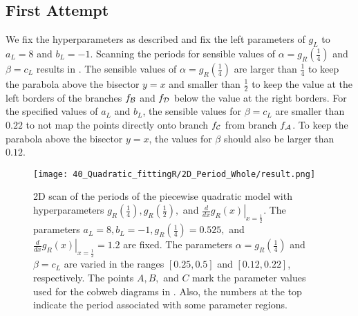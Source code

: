 \subsection{First Attempt}
\label{sec:setup.quad.hyper.1}

We fix the hyperparameters as described and fix the left parameters of $g_L$ to $a_L = 8$ and $b_L = -1$.
Scanning the periods for sensible values of $\alpha = g_R\left(\frac{1}{4}\right)$ and $\beta = c_L$ results in .
The sensible values of $\alpha = g_R\left(\frac{1}{4}\right)$ are larger than $\frac{1}{4}$ to keep the parabola above the bisector $y = x$ and smaller than $\frac{1}{2}$ to keep the value at the left borders of the branches $f_{\mathcal{B}}$ and $f_{\mathcal{D}}$ below the value at the right borders.
For the specified values of $a_L$ and $b_L$, the sensible values for $\beta = c_L$ are smaller than $0.22$ to not map the points directly onto branch $f_{\mathcal{C}}$ from branch $f_{\mathcal{A}}$.
To keep the parabola above the bisector $y = x$, the values for $\beta$ should also be larger than $0.12$.

\begin{figure}
	\centering
	\texttt{[image: 40\_Quadratic\_fittingR/2D\_Period\_Whole/result.png]}
	\caption[2D scan of the periods of the quadratic model with hyperparameters]{
	2D scan of the periods of the piecewise quadratic model with hyperparameters $g_R\left(\frac{1}{4}\right), g_R\left(\frac{1}{2}\right),$ and $\left. \frac{d}{dx} g_R\left(x\right) \right|_{x = \frac{1}{2}}$.
	The parameters $a_L = 8, b_L = -1, g_R\left(\frac{1}{4}\right) = 0.525,$ and $\left. \frac{d}{dx} g_R\left(x\right) \right|_{x = \frac{1}{2}} = 1.2$ are fixed.
	The parameters $\alpha = g_R\left(\frac{1}{4}\right)$ and $\beta = c_L$ are varied in the ranges $[0.25, 0.5]$ and $[0.12, 0.22]$, respectively.
	The points $A, B,$ and $C$ mark the parameter values used for the cobweb diagrams in .
	Also, the numbers at the top indicate the period associated with some parameter regions.
	}
	\label{fig:setup.quad.hyper.1.period}
\end{figure}

